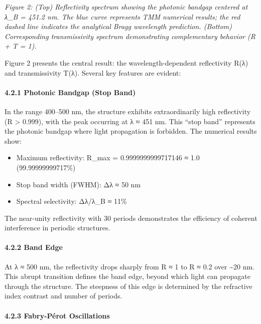\documentclass[
]{article}
\providecommand{\tightlist}{%
  \setlength{\itemsep}{0pt}\setlength{\parskip}{0pt}}
\begin{document}
\emph{Figure 2: (Top) Reflectivity spectrum showing the photonic bandgap
centered at λ\_B = 451.2 nm. The blue curve represents TMM numerical
results; the red dashed line indicates the analytical Bragg wavelength
prediction. (Bottom) Corresponding transmissivity spectrum demonstrating
complementary behavior (R + T = 1).}

Figure 2 presents the central result: the wavelength-dependent
reflectivity R(λ) and transmissivity T(λ). Several key features are
evident:

\paragraph{4.2.1 Photonic Bandgap (Stop
Band)}\label{photonic-bandgap-stop-band}

In the range 400--500 nm, the structure exhibits extraordinarily high
reflectivity (R \textgreater{} 0.999), with the peak occurring at λ ≈
451 nm. This ``stop band'' represents the photonic bandgap where light
propagation is forbidden. The numerical results show:

\begin{itemize}
\tightlist
\item
  Maximum reflectivity: R\_max = 0.9999999999717146 ≈ 1.0
  (99.99999999717\%)
\item
  Stop band width (FWHM): Δλ ≈ 50 nm
\item
  Spectral selectivity: Δλ/λ\_B ≈ 11\%
\end{itemize}

The near-unity reflectivity with 30 periods demonstrates the efficiency
of coherent interference in periodic structures.

\paragraph{4.2.2 Band Edge}\label{band-edge}

At λ ≈ 500 nm, the reflectivity drops sharply from R ≈ 1 to R ≈ 0.2 over
\textasciitilde20 nm. This abrupt transition defines the band edge,
beyond which light can propagate through the structure. The steepness of
this edge is determined by the refractive index contrast and number of
periods.

\paragraph{4.2.3 Fabry-Pérot
Oscillations}\label{fabry-puxe9rot-oscillations}
\end{document}
